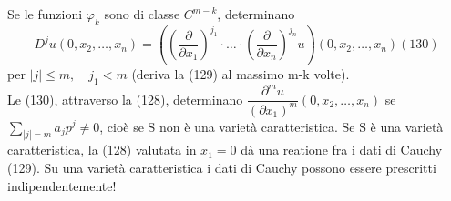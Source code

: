 \documentclass[a4paper,11pt]{report}
\begin{document}
Se le funzioni $\varphi_k$ sono di classe $C^{m-k}$, determinano 
\begin{equation}
D^j u(0,x_2,\dots,x_n)=\left(\left(\dfrac{\partial}{\partial x_1}\right)^{j_1}\cdot \dots \cdot \left(\dfrac{\partial}{\partial x_n}\right)^{j_n}u\right)(0,x_2,\dots,x_n) (130)
\end{equation}
per $|j|\leq m, \quad j_1<m$ (deriva la (129) al massimo m-k volte).\\
Le (130), attraverso la (128), determinano $\dfrac{\partial^m u}{(\partial x_1)^m} (0,x_2,\dots, x_n)$ se $\sum_{|j|=m} a_j p^j \neq 0$, cioè se S non è una varietà caratteristica. Se S è una varietà caratteristica, la (128) valutata in $x_1=0$ dà una reatione fra i dati di Cauchy (129). Su una varietà caratteristica i dati di Cauchy possono essere prescritti indipendentemente!
\end{document}
